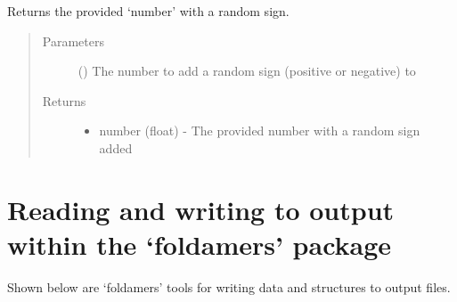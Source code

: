 \documentclass[letterpaper,12pt,english,openany,oneside]{sphinxmanual}
\begin{document}

\begin{fulllineitems}
\label{\detokenize{utilities:utilities.util.random_sign}}
Returns the provided ‘number’ with a random sign.
\begin{quote}\begin{description}
\item[{Parameters}] \leavevmode
{} () \textendash{} The number to add a random sign (positive or negative) to

\item[{Returns}] \leavevmode
\begin{itemize}
\item {} 
number (float) - The provided number with a random sign added

\end{itemize}


\end{description}\end{quote}

\end{fulllineitems}


\newpage


\section{Reading and writing to output within the ‘foldamers’ package}
\label{\detokenize{utilities:reading-and-writing-to-output-within-the-foldamers-package}}
Shown below are ‘foldamers’ tools for writing data and structures to output files.

\label{\detokenize{utilities:module-utilities.iotools}}
\end{document}
